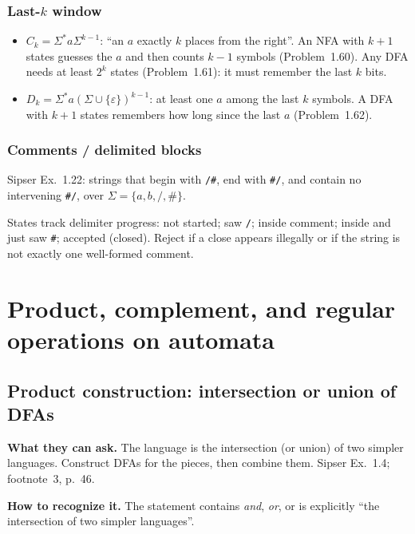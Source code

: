 \documentclass[11pt,a4paper]{article}
\newcommand{\eps}{\varepsilon}
\begin{document}
\subsubsection{Last-$k$ window}

\begin{itemize}[nosep]
  \item $C_k=\Sigma^*a\Sigma^{k-1}$: ``an $a$ exactly $k$ places from
        the right''. An NFA with $k+1$ states guesses the $a$ and then
        counts $k-1$ symbols (Problem~1.60). Any DFA needs at least
        $2^k$ states (Problem~1.61): it must remember the last $k$
        bits.
  \item $D_k=\Sigma^*a(\Sigma\cup\{\eps\})^{k-1}$: at least one $a$
        among the last $k$ symbols. A DFA with $k+1$ states remembers
        how long since the last $a$ (Problem~1.62).
\end{itemize}

\subsubsection{Comments / delimited blocks}

Sipser Ex.~1.22: strings that begin with \texttt{/\#}, end with
\texttt{\#/}, and contain no intervening \texttt{\#/}, over
$\Sigma=\{a,b,/,$\#$\}$.

States track delimiter progress: not started; saw \texttt{/}; inside
comment; inside and just saw \texttt{\#}; accepted (closed). Reject
if a close appears illegally or if the string is not exactly one
well-formed comment.

\section{Product, complement, and regular operations on automata}

\subsection{Product construction: intersection or union of DFAs}
\label{type:product}

\textbf{What they can ask.}
The language is the intersection (or union) of two simpler languages.
Construct DFAs for the pieces, then combine them. Sipser Ex.~1.4;
footnote~3, p.~46.

\textbf{How to recognize it.}
The statement contains \emph{and}, \emph{or}, or is explicitly ``the
intersection of two simpler languages''.
\end{document}
